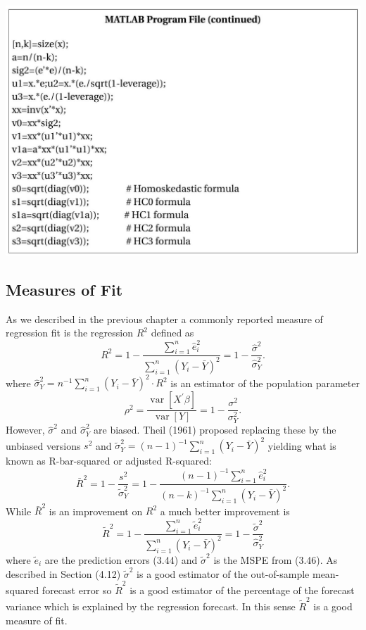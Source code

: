 \documentclass[10pt]{article}
\begin{document}
\includegraphics[max width=\textwidth]{2022_09_17_46fafb30295495354ae2g-23(1)}

\subsection{Measures of Fit}
As we described in the previous chapter a commonly reported measure of regression fit is the regression $R^{2}$ defined as
$$
R^{2}=1-\frac{\sum_{i=1}^{n} \widehat{e}_{i}^{2}}{\sum_{i=1}^{n}\left(Y_{i}-\bar{Y}\right)^{2}}=1-\frac{\widehat{\sigma}^{2}}{\widehat{\sigma}_{Y}^{2}} .
$$
where $\widehat{\sigma}_{Y}^{2}=n^{-1} \sum_{i=1}^{n}\left(Y_{i}-\bar{Y}\right)^{2} \cdot R^{2}$ is an estimator of the population parameter
$$
\rho^{2}=\frac{\operatorname{var}\left[X^{\prime} \beta\right]}{\operatorname{var}[Y]}=1-\frac{\sigma^{2}}{\sigma_{Y}^{2}} .
$$
However, $\widehat{\sigma}^{2}$ and $\widehat{\sigma}_{Y}^{2}$ are biased. Theil (1961) proposed replacing these by the unbiased versions $s^{2}$ and $\widetilde{\sigma}_{Y}^{2}=(n-1)^{-1} \sum_{i=1}^{n}\left(Y_{i}-\bar{Y}\right)^{2}$ yielding what is known as R-bar-squared or adjusted R-squared:
$$
\bar{R}^{2}=1-\frac{s^{2}}{\widetilde{\sigma}_{Y}^{2}}=1-\frac{(n-1)^{-1} \sum_{i=1}^{n} \widehat{e}_{i}^{2}}{(n-k)^{-1} \sum_{i=1}^{n}\left(Y_{i}-\bar{Y}\right)^{2}} .
$$
While $\bar{R}^{2}$ is an improvement on $R^{2}$ a much better improvement is
$$
\widetilde{R}^{2}=1-\frac{\sum_{i=1}^{n} \widetilde{e}_{i}^{2}}{\sum_{i=1}^{n}\left(Y_{i}-\bar{Y}\right)^{2}}=1-\frac{\widetilde{\sigma}^{2}}{\widehat{\sigma}_{Y}^{2}}
$$
where $\widetilde{e}_{i}$ are the prediction errors (3.44) and $\widetilde{\sigma}^{2}$ is the MSPE from (3.46). As described in Section (4.12) $\widetilde{\sigma}^{2}$ is a good estimator of the out-of-sample mean-squared forecast error so $\widetilde{R}^{2}$ is a good estimator of the percentage of the forecast variance which is explained by the regression forecast. In this sense $\widetilde{R}^{2}$ is a good measure of fit.
\end{document}
